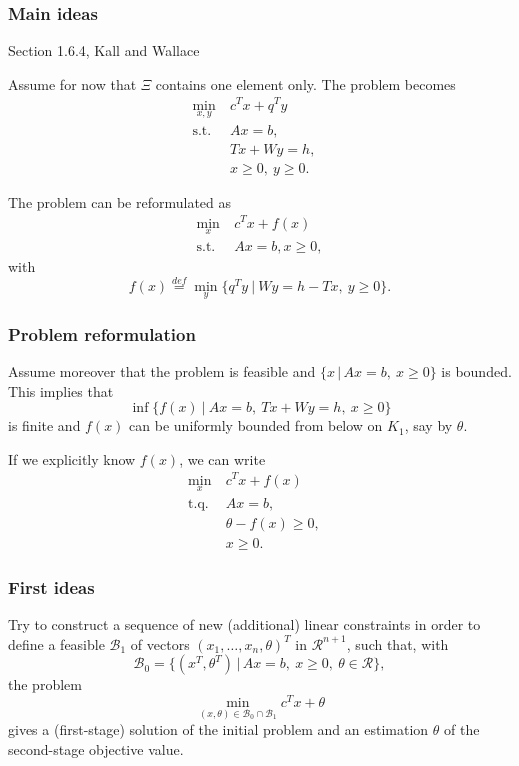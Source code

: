 \documentclass{beamer}
\def\rit{\mathcal{R}}
\begin{document}
\begin{frame}
\frametitle{Main ideas}

{\red Section 1.6.4, Kall and Wallace}

Assume for now that $\Xi$ contains one element only.
The problem becomes
\begin{align*}
\min_{x,y}\ & c^Tx + q^Ty & \\
\mbox{s.t. } & Ax = b, \\
& Tx + Wy = h, \\
& x \geq 0,\ y \geq 0.
\end{align*}

\mbox{}

The problem can be reformulated as
\begin{align*}
\min_x\ & c^Tx + f(x) \\
\mbox{s.t. } & Ax = b, x \geq 0,
\end{align*}
with
\[
f(x) \overset{def}{=} \min_y \lbrace q^Ty \ |\ Wy = h - Tx,\ y \geq 0 \rbrace.
\]

\end{frame}

\begin{frame}
\frametitle{Problem reformulation}

Assume moreover that the problem is feasible and $\lbrace x \,|\, Ax = b,\ x \geq 0 \rbrace$ is bounded. This implies that
\[
\inf \lbrace f(x) \ |\ Ax = b,\ Tx+Wy =h,\ x \geq 0 \rbrace
\]
is finite and $f(x)$ can be uniformly bounded from below on $K_1$, say by $\theta$.

\mbox{}

If we explicitly know $f(x)$, we can write
\begin{align*}
\min_x\ & c^Tx + f(x) & \\
\mbox{t.q. } & Ax = b, \\
& \theta - f(x) \geq 0, \\
& x \geq 0.
\end{align*}

\end{frame}

\begin{frame}
\frametitle{First ideas}

Try to construct a {\blue sequence of new (additional) linear constraints} in order to define a feasible $\mathcal{B}_1$ of vectors $(x_1,\ldots,x_n,\theta)^T$ in $\rit^{n+1}$, such that, with
\[
\mathcal{B}_0 = \lbrace (x^T, \theta^T) \,|\, Ax = b,\ x \geq 0,\
\theta \in \rit \rbrace,
\]
the problem
\[
\min_{(x,\theta) \in \mathcal{B}_0 \cap \mathcal{B}_1} c^Tx+\theta
\]
gives a (first-stage) solution of the initial problem and an estimation $\theta$ of the second-stage objective value.

\end{frame}
\end{document}

